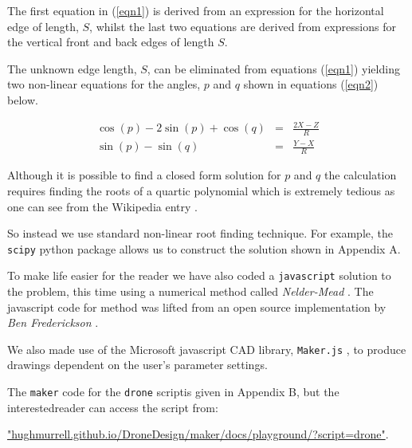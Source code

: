 \documentclass[11pt]{article}
\begin{document}
The first equation in (\ref{eqn1}) is derived from an expression for the horizontal edge of length, $S$,
whilst the last two equations are derived from expressions for the vertical front and back edges of length $S$.

The unknown edge length, $S$, can be eliminated from equations (\ref{eqn1}) yielding two non-linear
equations for the angles, $p$ and $q$ shown in equations (\ref{eqn2}) below.

\begin{eqnarray}
\cos(p) - 2 \sin(p) + \cos(q) & = & \frac{2X-Z}{R} \nonumber \\
\sin(p) - \sin(q) & = & \frac{Y-X}{R}   \label{eqn2} 
\end{eqnarray}

Although it is possible to find a closed form solution for $p$ and $q$ the calculation 
requires finding the roots of a quartic polynomial which is extremely tedious as one
can see from the Wikipedia entry \cite{quartic}.

So instead we use standard non-linear root finding technique. For example,
the {\tt scipy} python package allows us to construct the solution shown in Appendix A.

To make life easier for the reader we have also coded a {\tt javascript} solution to the
problem, this time using a numerical method called {\it Nelder-Mead} \cite{nelder}. 
The javascript code for method was lifted from an open source implementation by 
{\em Ben Frederickson} \cite{benfred}.

We also made use of the Microsoft javascript CAD library,
{\tt Maker.js} \cite{maker}, to produce drawings dependent on the user's parameter settings. 

The {\tt maker} code for the {\tt drone} scriptis given in Appendix B, but the interestedreader
can access the script from:

\small
\url{"hughmurrell.github.io/DroneDesign/maker/docs/playground/?script=drone"}.
\normalsize
\end{document}
